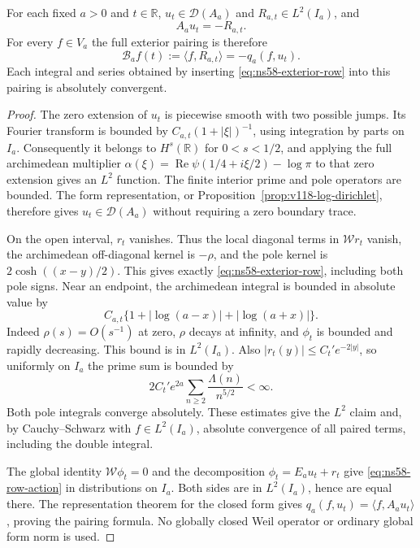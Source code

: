 \begin{proposition}
\label{prop:ns58-boundary-identity}
For each fixed $a>0$ and $t\in\mathbb R$,
$u_t\in\mathcal D(A_a)$ and $R_{a,t}\in L^2(I_a)$, and
\begin{equation}\label{eq:ns58-row-action}
 A_a u_t=-R_{a,t}.
\end{equation}
For every $f\in V_a$ the full exterior pairing is therefore
\begin{equation}\label{eq:ns58-boundary-pairing}
 \mathcal B_a f(t):=\langle f,R_{a,t}\rangle
                  =-q_a(f,u_t).
\end{equation}
Each integral and series obtained by inserting
\eqref{eq:ns58-exterior-row} into this pairing is absolutely convergent.
\end{proposition}
\begin{proof}
The zero extension of $u_t$ is piecewise smooth with two possible
jumps. Its Fourier transform is bounded by
$C_{a,t}(1+|\xi|)^{-1}$, using integration by parts on $I_a$.
Consequently it belongs to $H^s(\mathbb R)$ for $0<s<1/2$, and applying the
full archimedean multiplier
$\alpha(\xi)=\operatorname{Re}\psi(1/4+i\xi/2)-\log\pi$
to that zero extension gives an $L^2$ function. The finite interior prime and pole operators are
bounded. The form representation, or
Proposition~\ref{prop:v118-log-dirichlet}, therefore gives
$u_t\in\mathcal D(A_a)$ without requiring a zero boundary trace.

On the open interval, $r_t$ vanishes. Thus the local diagonal terms
in $\mathcal W r_t$ vanish, the archimedean off-diagonal kernel is
$-\rho$, and the pole kernel is $2\cosh((x-y)/2)$. This gives
exactly \eqref{eq:ns58-exterior-row}, including both pole signs.
Near an endpoint, the archimedean integral is bounded in absolute
value by
\[
 C_{a,t}\{1+|\log(a-x)|+|\log(a+x)|\}.
\]
Indeed $\rho(s)=O(s^{-1})$ at zero, $\rho$ decays at infinity,
and $\phi_t$ is bounded and rapidly decreasing. This bound is in
$L^2(I_a)$. Also $|r_t(y)|\le C_t' e^{-2|y|}$, so uniformly on
$I_a$ the prime sum is bounded by
\[
 2C_t'e^{2a}\sum_{n\ge2}\frac{\Lambda(n)}{n^{5/2}}<\infty.
\]
Both pole integrals converge absolutely. These estimates give the
$L^2$ claim and, by Cauchy--Schwarz with $f\in L^2(I_a)$,
absolute convergence of all paired terms, including the double integral.

The global identity $\mathcal W\phi_t=0$ and the decomposition
$\phi_t=E_a u_t+r_t$ give \eqref{eq:ns58-row-action} in distributions
on $I_a$. Both sides are in $L^2(I_a)$, hence are equal there.
The representation theorem for the closed form gives
$q_a(f,u_t)=\langle f,A_a u_t\rangle$, proving the pairing formula.
No globally closed Weil operator or ordinary global form norm is used.
\end{proof}


